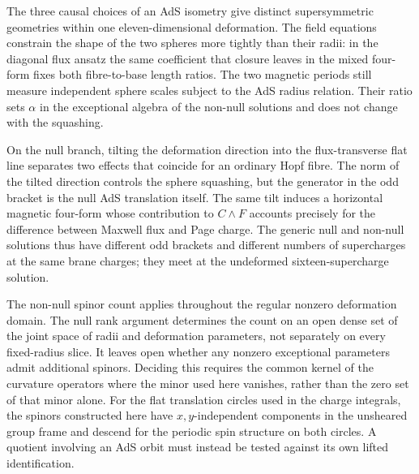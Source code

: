 \documentclass[11pt,a4paper]{article}
\numberwithin{equation}{section}
\begin{document}
The three causal choices of an AdS isometry give distinct supersymmetric geometries within one eleven-dimensional deformation. The field equations constrain the shape of the two spheres more tightly than their radii: in the diagonal flux ansatz the same coefficient that closure leaves in the mixed four-form fixes both fibre-to-base length ratios. The two magnetic periods still measure independent sphere scales subject to the AdS radius relation. Their ratio sets $\alpha$ in the exceptional algebra of the non-null solutions and does not change with the squashing.

On the null branch, tilting the deformation direction into the flux-transverse flat line separates two effects that coincide for an ordinary Hopf fibre. The norm of the tilted direction controls the sphere squashing, but the generator in the odd bracket is the null AdS translation itself. The same tilt induces a horizontal magnetic four-form whose contribution to $C\wedge F$ accounts precisely for the difference between Maxwell flux and Page charge. The generic null and non-null solutions thus have different odd brackets and different numbers of supercharges at the same brane charges; they meet at the undeformed sixteen-supercharge solution.

The non-null spinor count applies throughout the regular nonzero deformation domain. The null rank argument determines the count on an open dense set of the joint space of radii and deformation parameters, not separately on every fixed-radius slice. It leaves open whether any nonzero exceptional parameters admit additional spinors. Deciding this requires the common kernel of the curvature operators where the minor used here vanishes, rather than the zero set of that minor alone. For the flat translation circles used in the charge integrals, the spinors constructed here have $x,y$-independent components in the unsheared group frame and descend for the periodic spin structure on both circles. A quotient involving an AdS orbit must instead be tested against its own lifted identification.

\appendix

\end{document}
